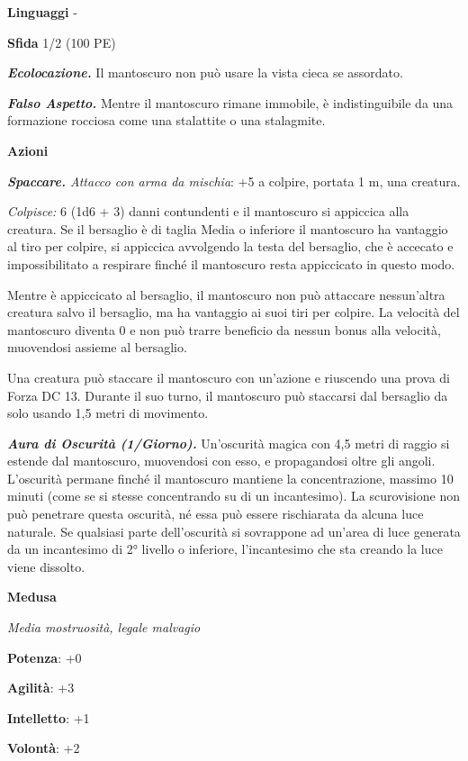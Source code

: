 \begin{multicols}{2}
\textbf{Linguaggi} -

\textbf{Sfida} 1/2 (100 PE)\smallskip

\emph{\textbf{Ecolocazione.}} Il mantoscuro non può usare la vista cieca
se assordato.

\emph{\textbf{Falso Aspetto.}} Mentre il mantoscuro rimane immobile, è
indistinguibile da una formazione rocciosa come una stalattite o una
stalagmite.

\smallskip\textbf{Azioni}

\emph{\textbf{Spaccare.} Attacco con arma da mischia}: +5 a colpire,
portata 1 m, una creatura.

\emph{Colpisce:} 6 (1d6 + 3) danni contundenti e il mantoscuro si
appiccica alla creatura. Se il bersaglio è di taglia Media o inferiore
il mantoscuro ha vantaggio al tiro per colpire, si appiccica avvolgendo
la testa del bersaglio, che è accecato e impossibilitato a respirare
finché il mantoscuro resta appiccicato in questo modo.

Mentre è appiccicato al bersaglio, il mantoscuro non può attaccare
nessun'altra creatura salvo il bersaglio, ma ha vantaggio ai suoi tiri
per colpire. La velocità del mantoscuro diventa 0 e non può trarre
beneficio da nessun bonus alla velocità, muovendosi assieme al
bersaglio.

Una creatura può staccare il mantoscuro con un'azione e riuscendo una
prova di Forza DC 13. Durante il suo turno, il mantoscuro può staccarsi
dal bersaglio da solo usando 1,5 metri di movimento.

\emph{\textbf{Aura di Oscurità (1/Giorno).}} Un'oscurità magica con 4,5
metri di raggio si estende dal mantoscuro, muovendosi con esso, e
propagandosi oltre gli angoli. L'oscurità permane finché il mantoscuro
mantiene la concentrazione, massimo 10 minuti (come se si stesse
concentrando su di un incantesimo). La scurovisione non può penetrare
questa oscurità, né essa può essere rischiarata da alcuna luce naturale.
Se qualsiasi parte dell'oscurità si sovrappone ad un'area di luce
generata da un incantesimo di 2° livello o inferiore, l'incantesimo che
sta creando la luce viene dissolto.

\textbf{Medusa}

\emph{Media mostruosità, legale malvagio}

\textbf{Potenza}: +0

\textbf{Agilità}: +3

\textbf{Intelletto}: +1

\textbf{Volontà}: +2


\end{multicols}
